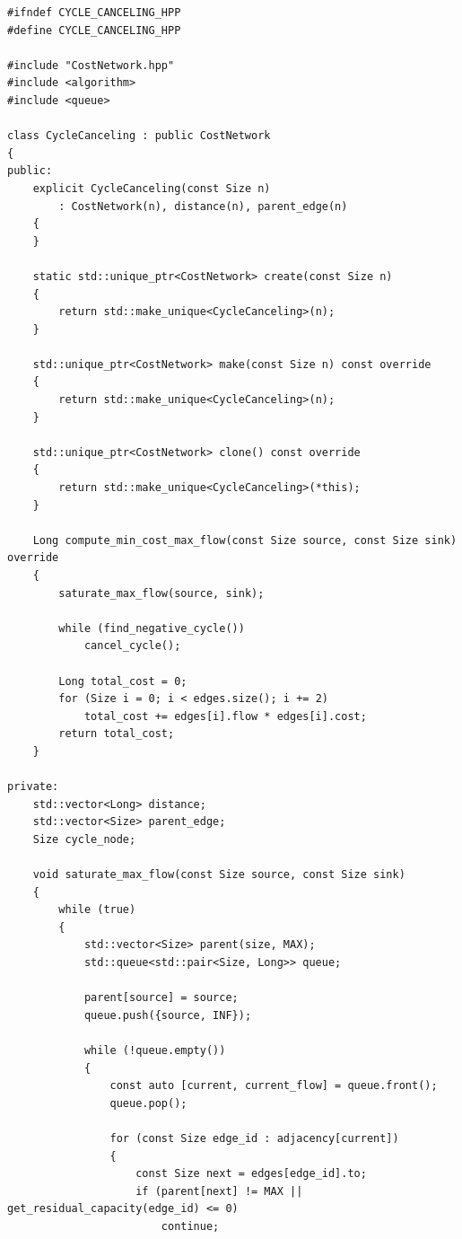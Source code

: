 \documentclass[12pt,a4paper]{article}
\begin{document}
\newpage

\label{ap:cycle_canceling}

\begin{lstlisting}[caption={Implementação em C++ do algoritmo \textit{Cycle Canceling}.}, label={lst:cycle_canceling}]
#ifndef CYCLE_CANCELING_HPP
#define CYCLE_CANCELING_HPP

#include "CostNetwork.hpp"
#include <algorithm>
#include <queue>

class CycleCanceling : public CostNetwork
{
public:
	explicit CycleCanceling(const Size n)
	    : CostNetwork(n), distance(n), parent_edge(n)
	{
	}

	static std::unique_ptr<CostNetwork> create(const Size n)
	{
		return std::make_unique<CycleCanceling>(n);
	}

	std::unique_ptr<CostNetwork> make(const Size n) const override
	{
		return std::make_unique<CycleCanceling>(n);
	}

	std::unique_ptr<CostNetwork> clone() const override
	{
		return std::make_unique<CycleCanceling>(*this);
	}

	Long compute_min_cost_max_flow(const Size source, const Size sink) override
	{
		saturate_max_flow(source, sink);

		while (find_negative_cycle())
			cancel_cycle();

		Long total_cost = 0;
		for (Size i = 0; i < edges.size(); i += 2)
			total_cost += edges[i].flow * edges[i].cost;
		return total_cost;
	}

private:
	std::vector<Long> distance;
	std::vector<Size> parent_edge;
	Size cycle_node;

	void saturate_max_flow(const Size source, const Size sink)
	{
		while (true)
		{
			std::vector<Size> parent(size, MAX);
			std::queue<std::pair<Size, Long>> queue;

			parent[source] = source;
			queue.push({source, INF});

			while (!queue.empty())
			{
				const auto [current, current_flow] = queue.front();
				queue.pop();

				for (const Size edge_id : adjacency[current])
				{
					const Size next = edges[edge_id].to;
					if (parent[next] != MAX || get_residual_capacity(edge_id) <= 0)
						continue;


\end{lstlisting}
\end{document}
